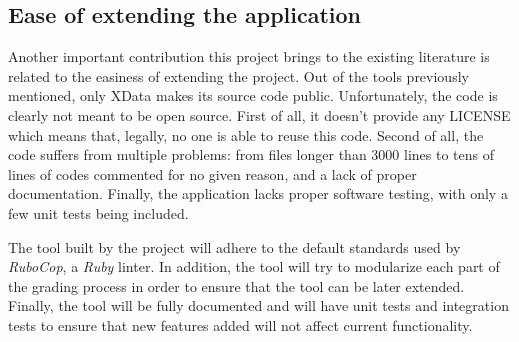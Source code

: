 \subsection{Ease of extending the application}

Another important contribution this project brings to the existing literature is related to the easiness of extending the project. Out of the tools previously mentioned, only XData makes its source code public. Unfortunately, the code is clearly not meant to be open source. First of all, it doesn't provide any LICENSE which means that, legally, no one is able to reuse this code. Second of all, the code suffers from multiple problems: from files longer than 3000 lines to tens of lines of codes commented for no given reason, and a lack of proper documentation. Finally, the application lacks proper software testing, with only a few unit tests being included.

The tool built by the project will adhere to the default standards used by \textit{RuboCop}, a \textit{Ruby} linter. In addition, the tool will try to modularize each part of the grading process in order to ensure that the tool can be later extended. Finally, the tool will be fully documented and will have unit tests and integration tests to ensure that new features added will not affect current functionality.
